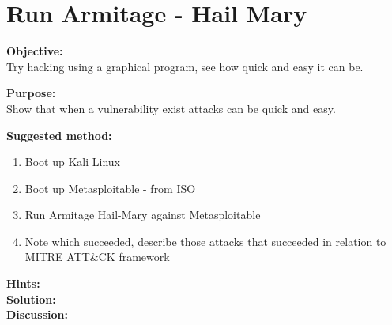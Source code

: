 \documentclass[a4paper,11pt,notitlepage]{report}
\begin{document}














\chapter{Run Armitage - Hail Mary}
\label{ex:hail-mary}

{\bf Objective:}\\
Try hacking using a graphical program, see how quick and easy it can be.

{\bf Purpose:}\\
Show that when a vulnerability exist attacks can be quick and easy.

{\bf Suggested method:}\\

\begin{enumerate}
\item Boot up Kali Linux
\item Boot up Metasploitable - from ISO
\item Run Armitage Hail-Mary against Metasploitable
\item Note which succeeded, describe those attacks that succeeded in relation to MITRE ATT\&CK framework
\end{enumerate}

{\bf Hints:}\\


{\bf Solution:}\\


{\bf Discussion:}\\
\end{document}
